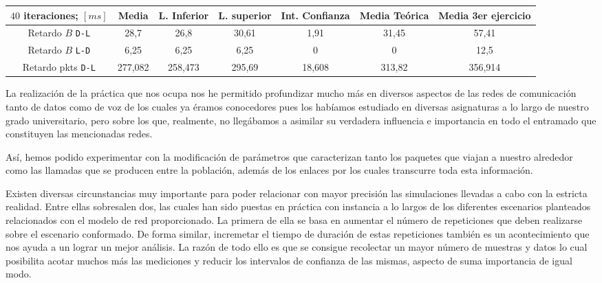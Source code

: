 \begin{tabular}{| c | c | c | c | c | c | c |}
			\hline
			$40$ iteraciones; $[ms]$ & Media & L. Inferior & L. superior & Int. Confianza & Media Teórica & Media 3er ejercicio\\
			\hline
			Retardo $B$ \texttt{D-L} & 28,7 & 26,8 & 30,61 & 1,91 & 31,45 & 57,41\\
			\hline
			Retardo $B$ \texttt{L-D} & 6,25 & 6,25 & 6,25 & 0 & 0 & 12,5\\
			\hline
			Retardo pkts \texttt{D-L} & 277,082 & 258,473 & 295,69 & 18,608 & 313,82 & 356,914\\
			\hline
\end{tabular}

La realización de la práctica que nos ocupa nos he permitido profundizar mucho más en diversos aspectos de las redes de comunicación tanto de datos como de voz de los cuales ya éramos conocedores pues los habíamos estudiado en diversas asignaturas a lo largo de nuestro grado universitario, pero sobre los que, realmente, no llegábamos a asimilar su verdadera influencia e importancia en todo el entramado que constituyen las mencionadas redes.

		Así, hemos podido experimentar con la modificación de parámetros que caracterizan tanto los paquetes que viajan a nuestro alrededor como las llamadas que se producen entre la población, además de los enlaces por los cuales transcurre toda esta información.

		Existen diversas circunstancias muy importante para poder relacionar con mayor precisión las simulaciones llevadas a cabo con la estricta realidad. Entre ellas sobresalen dos, las cuales han sido puestas en práctica con instancia a lo largos de los diferentes escenarios planteados relacionados con el modelo de red proporcionado. La primera de ella se basa en aumentar el número de repeticiones que deben realizarse sobre el escenario conformado. De forma similar, incremetar el tiempo de duración de estas repeticiones también es un acontecimiento que nos ayuda a un lograr un mejor análisis. La razón de todo ello es que se consigue recolectar un mayor número de muestras y datos lo cual posibilita acotar muchos más las mediciones y reducir los intervalos de confianza de las mismas, aspecto de suma importancia de igual modo.

